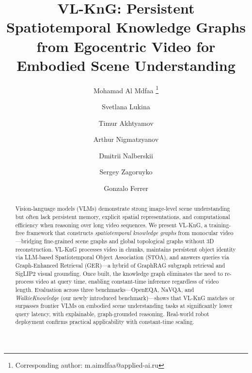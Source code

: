 \documentclass[runningheads]{llncs}
\begin{document}
\title{VL-KnG: Persistent Spatiotemporal Knowledge Graphs from Egocentric Video for Embodied Scene Understanding}


\author{
Mohamad Al Mdfaa \thanks{Corresponding author: m.aimdfaa@applied-ai.ru} \and
Svetlana Lukina \and
Timur Akhtyamov \and
Arthur Nigmatzyanov \and
Dmitrii Nalberskii \and
Sergey Zagoruyko \and
Gonzalo Ferrer
}


\maketitle

\begin{abstract}
Vision-language models (VLMs) demonstrate strong image-level scene understanding but often lack persistent memory, explicit spatial representations, and computational efficiency when reasoning over long video sequences.
We present VL-KnG, a training-free framework that constructs \textit{spatiotemporal knowledge graphs} from monocular video---bridging fine-grained scene graphs and global topological graphs without 3D reconstruction.
VL-KnG processes video in chunks, maintains persistent object identity via LLM-based Spatiotemporal Object Association (STOA), and answers queries via Graph-Enhanced Retrieval (GER)---a hybrid of GraphRAG subgraph retrieval and SigLIP2 visual grounding.
Once built, the knowledge graph eliminates the need to re-process video at query time, enabling constant-time inference regardless of video length.
Evaluation across three benchmarks---OpenEQA, NaVQA, and {\em WalkieKnowledge} (our newly introduced benchmark)---shows that VL-KnG matches or surpasses frontier VLMs on embodied scene understanding tasks at significantly lower query latency, with explainable, graph-grounded reasoning.
Real-world robot deployment confirms practical applicability with constant-time scaling.
\end{abstract}
\end{document}
